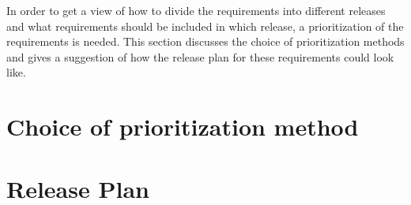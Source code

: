 \documentclass[../main.tex]{subfiles}
\begin{document}
	In order to get a view of how to divide the requirements into different releases and what requirements should be included in which release, a prioritization of the requirements is needed. This section discusses the choice of prioritization methods and gives a suggestion of how the release plan for these requirements could look like.
	\section{Choice of prioritization method}
	\section{Release Plan}
\end{document}
